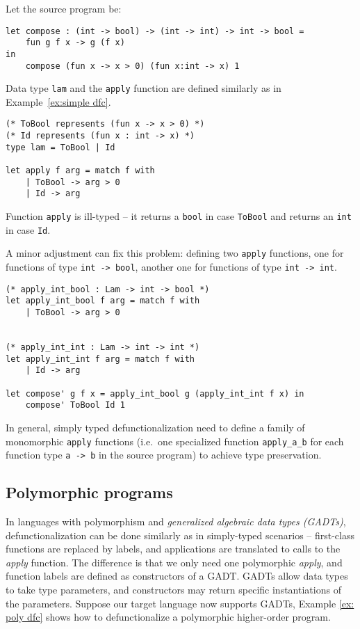 \begin{exmp}
\label{ex:illtype dfc}
Let the source program be:
\begin{lstlisting}
let compose : (int -> bool) -> (int -> int) -> int -> bool =
    fun g f x -> g (f x)
in 
    compose (fun x -> x > 0) (fun x:int -> x) 1
\end{lstlisting}
Data type \texttt{lam} and the \texttt{apply} function are defined similarly as in Example~\ref{ex:simple dfc}.
\begin{lstlisting}
(* ToBool represents (fun x -> x > 0) *)
(* Id represents (fun x : int -> x) *)
type lam = ToBool | Id

let apply f arg = match f with
    | ToBool -> arg > 0
    | Id -> arg
\end{lstlisting}
Function \texttt{apply} is ill-typed -- it returns a \texttt{bool} in case \texttt{ToBool} and returns an \texttt{int} in case \texttt{Id}.
\end{exmp}

A minor adjustment can fix this problem: defining two \texttt{apply} functions, one for functions of type \texttt{int -> bool}, another one for functions of type \texttt{int -> int}.

\begin{lstlisting}
(* apply_int_bool : Lam -> int -> bool *)
let apply_int_bool f arg = match f with
	| ToBool -> arg > 0


(* apply_int_int : Lam -> int -> int *)
let apply_int_int f arg = match f with
	| Id -> arg

let compose' g f x = apply_int_bool g (apply_int_int f x) in
    compose' ToBool Id 1
\end{lstlisting}

In general, simply typed defunctionalization need to define a family of monomorphic \texttt{apply} functions (i.e.~one specialized function \texttt{apply\_a\_b} for each function type \texttt{a -> b} in the source program) to achieve type preservation.

\subsection{Polymorphic programs}

In languages with polymorphism and \textit{generalized algebraic data types (GADTs)}, defunctionalization can be done similarly as in simply-typed scenarios – first-class functions are replaced by labels, and applications are translated to calls to the \textit{apply} function. The difference is that we only need one polymorphic \textit{apply}, and function labels are defined as constructors of a GADT. GADTs allow data types to take type parameters, and constructors may return specific instantiations of the parameters. Suppose our target language now supports GADTs, Example \ref{ex: poly dfc} shows how to defunctionalize a polymorphic higher-order program.

